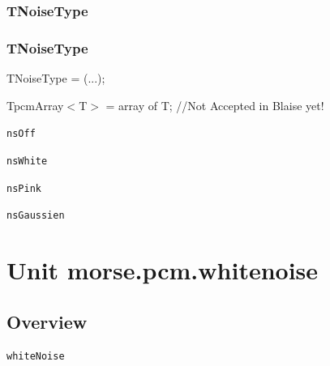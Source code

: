 \documentclass{report}
\newif\ifpdf
\begin{document}
\subsection*{\large{\textbf{TNoiseType}}\normalsize\hspace{1ex}\hrulefill}
\else
\subsection*{TNoiseType}
\fi
\label{morse.pcm.Util-TNoiseType}
\begin{list}{}{
\setlength{\itemindent}{0cm}
\setlength{\listparindent}{0cm}
\setlength{\leftmargin}{\evensidemargin}
\addtolength{\leftmargin}{\tmplength}
\settowidth{\labelsep}{X}
\addtolength{\leftmargin}{\labelsep}
\setlength{\labelwidth}{\tmplength}
}
\item[\textbf{Declaration}\hfill]
\ifpdf
\begin{flushleft}
\fi
\begin{ttfamily}
TNoiseType = (...);\end{ttfamily}

\ifpdf
\end{flushleft}
\fi

\par
\item[\textbf{Description}]
TpcmArray{$<$}T{$>$} = array of T; //Not Accepted in Blaise yet!\item[\textbf{Values}]
\begin{description}
\item[\texttt{nsOff}] \label{morse.pcm.Util-nsOff}
\index{}
 
\item[\texttt{nsWhite}] \label{morse.pcm.Util-nsWhite}
\index{}
 
\item[\texttt{nsPink}] \label{morse.pcm.Util-nsPink}
\index{}
 
\item[\texttt{nsGaussien}] \label{morse.pcm.Util-nsGaussien}
\index{}
 
\end{description}


\end{list}
\chapter{Unit morse.pcm.whitenoise}
\label{morse.pcm.whitenoise}
\section{Overview}
\begin{description}
\item[\texttt{whiteNoise}]
\end{description}
\end{document}
